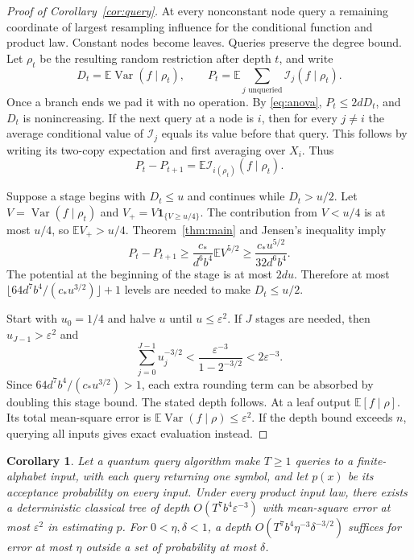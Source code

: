 \documentclass[11pt,reqno]{amsart}
\newtheorem{corollary}[theorem]{Corollary}
\theoremstyle{definition}
\theoremstyle{remark}
\newcommand{\E}{\mathbb E}
\newcommand{\Var}{\operatorname{Var}}
\newcommand{\one}{\mathbf 1}
\newcommand{\cI}{\mathcal I}
\newcommand{\eps}{\varepsilon}
\numberwithin{equation}{section}
\begin{document}
\begin{proof}[Proof of Corollary~\ref{cor:query}]
At every nonconstant node query a remaining coordinate of largest
resampling influence for the conditional function and product law.
Constant nodes become leaves. Queries preserve the degree bound.
Let $\rho_t$ be the resulting random restriction after depth $t$, and
write
\[
 D_t=\E\Var(f\mid\rho_t),\qquad
 P_t=\E\sum_{j\text{ unqueried}}\cI_j(f\mid\rho_t).
\]
Once a branch ends we pad it with no operation. By
\eqref{eq:anova}, $P_t\le2dD_t$, and $D_t$ is nonincreasing.
If the next query at a node is $i$, then for every $j\ne i$ the average
conditional value of $\cI_j$ equals its value before that query.
This follows by writing its two-copy expectation and first averaging
over $X_i$. Thus
\begin{equation}\label{eq:potential}
 P_t-P_{t+1}=\E\cI_{i(\rho_t)}(f\mid\rho_t).
\end{equation}

Suppose a stage begins with $D_t\le u$ and continues while $D_t>u/2$.
Let $V=\Var(f\mid\rho_t)$ and $V_+=V\one_{\{V\ge u/4\}}$.
The contribution from $V<u/4$ is at most $u/4$, so
$\E V_+>u/4$. Theorem~\ref{thm:main} and Jensen's inequality imply
\[
 P_t-P_{t+1}\ge\frac{c_*}{d^6b^4}\E V^{5/2}
 \ge\frac{c_*u^{5/2}}{32d^6b^4}.
\]
The potential at the beginning of the stage is at most $2du$.
Therefore at most
$\lfloor64d^7b^4/(c_*u^{3/2})\rfloor+1$ levels are needed to make
$D_t\le u/2$.

Start with $u_0=1/4$ and halve $u$ until $u\le\eps^2$.
If $J$ stages are needed, then $u_{J-1}>\eps^2$ and
\[
 \sum_{j=0}^{J-1}u_j^{-3/2}
 <\frac{\eps^{-3}}{1-2^{-3/2}}<2\eps^{-3}.
\]
Since $64d^7b^4/(c_*u^{3/2})>1$, each extra rounding term can
be absorbed by doubling this stage bound. The stated depth follows.
At a leaf output $\E[f\mid\rho]$. Its total mean-square error is
$\E\Var(f\mid\rho)\le\eps^2$. If the depth bound exceeds $n$, querying
all inputs gives exact evaluation instead.
\end{proof}

\begin{corollary}\label{cor:quantum}
Let a quantum query algorithm make $T\ge1$ queries to a finite-alphabet
input, with each query returning one symbol, and let $p(x)$ be its
acceptance probability on every input. Under every product input law,
there exists a deterministic classical tree of depth
$O(T^7b^4\eps^{-3})$ with mean-square error at most $\eps^2$ in estimating
$p$. For $0<\eta,\delta<1$, a depth
$O(T^7b^4\eta^{-3}\delta^{-3/2})$ suffices for error at most $\eta$
outside a set of probability at most $\delta$.
\end{corollary}
\end{document}
